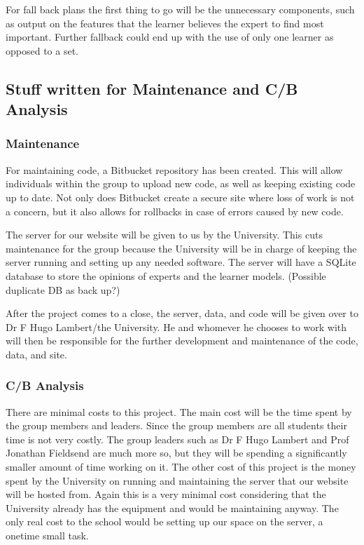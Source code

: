 \documentclass[11pt]{article} %
\numberwithin{equation}{section}
\begin{document}
\begin{itemize}
\quad For fall back plans the first thing to go will be the unnecessary components, such as output on the features that the learner believes the expert to find most important. Further fallback could end up with the use of only one learner as opposed to a set.\par

\subsection{Stuff written for Maintenance and C/B Analysis}

\subsubsection{Maintenance}
\quad For maintaining code, a Bitbucket repository has been created. This will allow individuals within the group to upload new code, as well as keeping existing code up to date.  Not only does Bitbucket create a secure site where loss of work is not a concern, but it also allows for rollbacks in case of errors caused by new code.\par

\quad The server for our website will be given to us by the University. This cuts maintenance for the group because the University will be in charge of keeping the server running and setting up any needed software. The server will have a SQLite database to store the opinions of experts and the learner models. (Possible duplicate DB as back up?)\par

\quad After the project comes to a close, the server, data, and code will be given over to Dr F Hugo Lambert/the University. He and whomever he chooses to work with will then be responsible for the further development and maintenance of the code, data, and site.\par


\subsubsection{C/B Analysis}

\quad There are minimal costs to this project. The main cost will be the time spent by the group members and leaders. Since the group members are all students their time is not very costly. The group leaders such as Dr F Hugo Lambert and Prof Jonathan Fieldsend are much more so, but they will be spending a significantly smaller amount of time working on it. The other cost of this project is the money spent by the University on running and maintaining the server that our website will be hosted from. Again this is a very minimal cost considering that the University already has the equipment and would be maintaining anyway. The only real cost to the school would be setting up our space on the server, a onetime small task.\par


\end{itemize}
\end{document}
